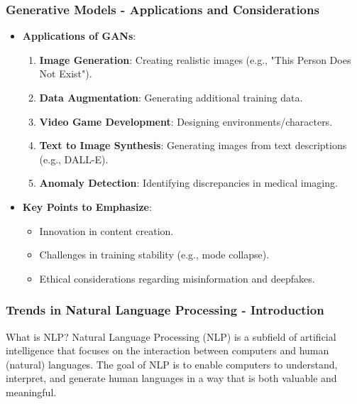\documentclass{beamer}
\begin{document}
\begin{frame}[fragile]
    \frametitle{Generative Models - Applications and Considerations}
    \begin{itemize}
        \item \textbf{Applications of GANs}:
            \begin{enumerate}
                \item \textbf{Image Generation}: Creating realistic images (e.g., "This Person Does Not Exist").
                \item \textbf{Data Augmentation}: Generating additional training data.
                \item \textbf{Video Game Development}: Designing environments/characters.
                \item \textbf{Text to Image Synthesis}: Generating images from text descriptions (e.g., DALL-E).
                \item \textbf{Anomaly Detection}: Identifying discrepancies in medical imaging.
            \end{enumerate}
        \item \textbf{Key Points to Emphasize}:
            \begin{itemize}
                \item Innovation in content creation.
                \item Challenges in training stability (e.g., mode collapse).
                \item Ethical considerations regarding misinformation and deepfakes.
            \end{itemize}
    \end{itemize}
\end{frame}

\begin{frame}[fragile]
    \frametitle{Trends in Natural Language Processing - Introduction}
    \begin{block}{What is NLP?}
        Natural Language Processing (NLP) is a subfield of artificial intelligence that focuses on the interaction between computers and human (natural) languages. The goal of NLP is to enable computers to understand, interpret, and generate human languages in a way that is both valuable and meaningful.
    \end{block}
\end{frame}
\end{document}
